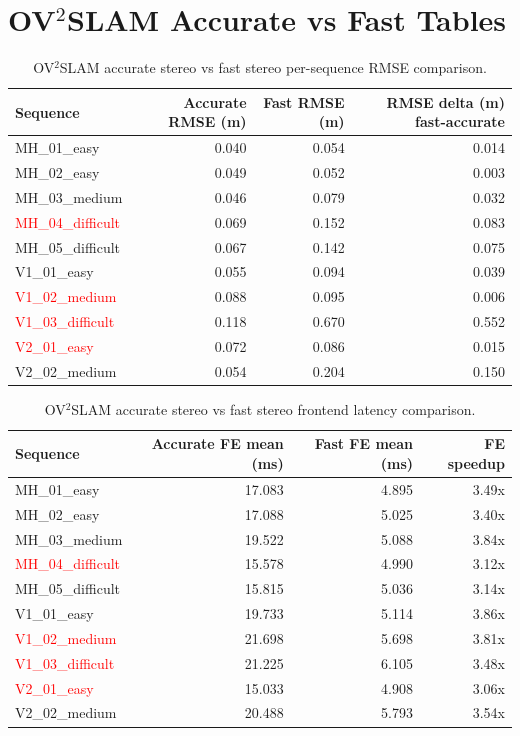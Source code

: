 \documentclass[11pt]{article}
\begin{document}
\section{OV$^{2}$SLAM Accurate vs Fast Tables}

\begin{table}[H]
\centering
\small
\caption{OV$^{2}$SLAM accurate stereo vs fast stereo per-sequence RMSE comparison.}
\label{tab:ov2_accurate_fast_rmse_summary}
\begin{tabular}{lrrr}
\toprule
Sequence & Accurate RMSE (m) & Fast RMSE (m) & RMSE delta (m) fast-accurate \\
\midrule
MH\_01\_easy & 0.040 & 0.054 & 0.014 \\
MH\_02\_easy & 0.049 & 0.052 & 0.003 \\
MH\_03\_medium & 0.046 & 0.079 & 0.032 \\
\textcolor{red}{MH\_04\_difficult} & 0.069 & 0.152 & 0.083 \\
MH\_05\_difficult & 0.067 & 0.142 & 0.075 \\
V1\_01\_easy & 0.055 & 0.094 & 0.039 \\
\textcolor{red}{V1\_02\_medium} & 0.088 & 0.095 & 0.006 \\
\textcolor{red}{V1\_03\_difficult} & 0.118 & 0.670 & 0.552 \\
\textcolor{red}{V2\_01\_easy} & 0.072 & 0.086 & 0.015 \\
V2\_02\_medium & 0.054 & 0.204 & 0.150 \\
\bottomrule
\end{tabular}
\end{table}

\begin{table}[H]
\centering
\small
\caption{OV$^{2}$SLAM accurate stereo vs fast stereo frontend latency comparison.}
\label{tab:ov2_accurate_fast_fe_summary}
\begin{tabular}{lrrr}
\toprule
Sequence & Accurate FE mean (ms) & Fast FE mean (ms) & FE speedup \\
\midrule
MH\_01\_easy & 17.083 & 4.895 & 3.49x \\
MH\_02\_easy & 17.088 & 5.025 & 3.40x \\
MH\_03\_medium & 19.522 & 5.088 & 3.84x \\
\textcolor{red}{MH\_04\_difficult} & 15.578 & 4.990 & 3.12x \\
MH\_05\_difficult & 15.815 & 5.036 & 3.14x \\
V1\_01\_easy & 19.733 & 5.114 & 3.86x \\
\textcolor{red}{V1\_02\_medium} & 21.698 & 5.698 & 3.81x \\
\textcolor{red}{V1\_03\_difficult} & 21.225 & 6.105 & 3.48x \\
\textcolor{red}{V2\_01\_easy} & 15.033 & 4.908 & 3.06x \\
V2\_02\_medium & 20.488 & 5.793 & 3.54x \\
\bottomrule
\end{tabular}
\end{table}
\end{document}

